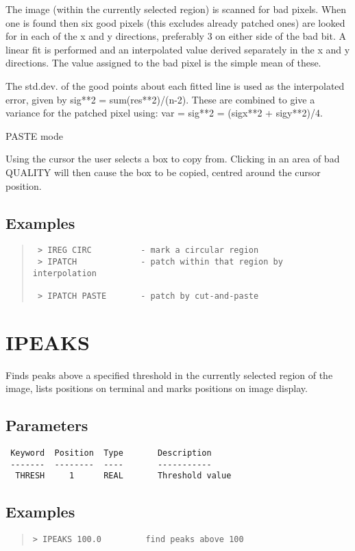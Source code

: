 \documentclass{book}
\renewcommand{\_}{{\tt\char'137}}     %
\begin{document}
The image (within the currently selected region) is scanned for bad
pixels. When one is found then six good pixels (this excludes already
patched ones) are looked for in each of the x and y directions,
preferably 3 on either side of the bad bit. A linear fit is performed
and an interpolated value derived separately in the x and y directions.
The value assigned to the bad pixel is the simple mean of these.

The std.dev. of the good points about each fitted line is used as
the interpolated error, given by sig**2 = sum(res**2)/(n-2). These
are combined to give a variance for the patched pixel using:
var = sig**2 = (sigx**2 + sigy**2)/4.

PASTE mode

Using the cursor the user selects a box to copy from. Clicking in
an area of bad QUALITY will then cause the box to be copied, centred
around the cursor position.

\subsection{Examples}
\begin{quote}\begin{verbatim}
 > IREG CIRC          - mark a circular region
 > IPATCH             - patch within that region by interpolation

 > IPATCH PASTE       - patch by cut-and-paste
 \end{verbatim}\end{quote}
\section{IPEAKS}
Finds peaks above a specified threshold in the currently selected
region of the image, lists positions on terminal and marks positions
on image display.

\subsection{Parameters}
\begin{verbatim}
 Keyword  Position  Type       Description
 -------  --------  ----       -----------
  THRESH     1      REAL       Threshold value

\end{verbatim}\subsection{Examples}
\begin{quote}\begin{verbatim}
> IPEAKS 100.0         find peaks above 100
\end{verbatim}\end{quote}
\end{document}
